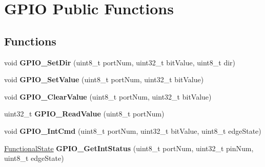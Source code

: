 \hypertarget{group___g_p_i_o___public___functions}{\section{\-G\-P\-I\-O \-Public \-Functions}
\label{group___g_p_i_o___public___functions}
}
\subsection*{\-Functions}
\begin{DoxyCompactItemize}
\item 
\hypertarget{group___g_p_i_o___public___functions_ga8c31c99596c6c47e513186788882b47c}{void {\bfseries \-G\-P\-I\-O\-\_\-\-Set\-Dir} (uint8\-\_\-t port\-Num, uint32\-\_\-t bit\-Value, uint8\-\_\-t dir)}\label{group___g_p_i_o___public___functions_ga8c31c99596c6c47e513186788882b47c}

\item 
\hypertarget{group___g_p_i_o___public___functions_gacdcb07acb7ca418274baee8cbd4f810c}{void {\bfseries \-G\-P\-I\-O\-\_\-\-Set\-Value} (uint8\-\_\-t port\-Num, uint32\-\_\-t bit\-Value)}\label{group___g_p_i_o___public___functions_gacdcb07acb7ca418274baee8cbd4f810c}

\item 
\hypertarget{group___g_p_i_o___public___functions_gaa2abb4e13b93d567c22917eb1fda5589}{void {\bfseries \-G\-P\-I\-O\-\_\-\-Clear\-Value} (uint8\-\_\-t port\-Num, uint32\-\_\-t bit\-Value)}\label{group___g_p_i_o___public___functions_gaa2abb4e13b93d567c22917eb1fda5589}

\item 
\hypertarget{group___g_p_i_o___public___functions_gac3d5c73668775dd7f5320c6cdf6b9e0c}{uint32\-\_\-t {\bfseries \-G\-P\-I\-O\-\_\-\-Read\-Value} (uint8\-\_\-t port\-Num)}\label{group___g_p_i_o___public___functions_gac3d5c73668775dd7f5320c6cdf6b9e0c}

\item 
\hypertarget{group___g_p_i_o___public___functions_ga88ea99cb18ddfa3eb641b8f2fa8d63ad}{void {\bfseries \-G\-P\-I\-O\-\_\-\-Int\-Cmd} (uint8\-\_\-t port\-Num, uint32\-\_\-t bit\-Value, uint8\-\_\-t edge\-State)}\label{group___g_p_i_o___public___functions_ga88ea99cb18ddfa3eb641b8f2fa8d63ad}

\item 
\hypertarget{group___g_p_i_o___public___functions_ga9904b2e813fe5499964ba18e2f3323c8}{\hyperlink{group___l_p_c___types___public___types_gac9a7e9a35d2513ec15c3b537aaa4fba1}{\-Functional\-State} {\bfseries \-G\-P\-I\-O\-\_\-\-Get\-Int\-Status} (uint8\-\_\-t port\-Num, uint32\-\_\-t pin\-Num, uint8\-\_\-t edge\-State)}\label{group___g_p_i_o___public___functions_ga9904b2e813fe5499964ba18e2f3323c8}


\end{DoxyCompactItemize}
